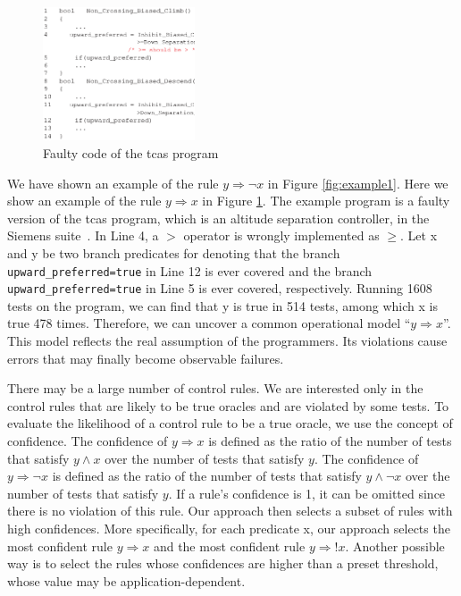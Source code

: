 \documentclass{sig-alternate}
\newcommand{\CodeIn}[1]{{\small\texttt{#1}}}
\begin{document}
\begin{figure}[h]
\begin{center}
  \includegraphics[angle=0,width=0.4\textwidth]{figs/example21.eps}
  \centering
  \caption{Faulty code of the tcas program}
  \label{fig:example2}
\end{center}
\end{figure}


We have shown an example of the rule $y\Rightarrow \neg x$ in Figure
\ref{fig:example1}. Here we show an example of the rule
$y\Rightarrow x$ in Figure \ref{fig:example2}. The example program
is a faulty version of the tcas program, which is an altitude
separation controller, in the Siemens suite~\cite{Hutchins94}. In
Line 4, a $>$ operator is wrongly implemented as $\ge$. Let x and y
be two branch predicates for denoting that the branch
\CodeIn{upward\_preferred=true} in Line 12 is ever covered and the
branch \CodeIn{upward\_preferred=true} in Line 5 is ever covered,
respectively. Running 1608 tests on the program, we can find that y
is true in 514 tests, among which x is true 478 times. Therefore, we
can uncover a common operational model ``$y\Rightarrow x$''. This
model reflects the real assumption of the programmers. Its
violations cause errors that may finally become observable failures.



There may be a large number of control rules. We are interested only
in the control rules that are likely to be true oracles and are
violated by some tests. To evaluate the likelihood of a control rule
to be a true oracle, we use the concept of confidence. The
confidence of $y\Rightarrow x$ is defined as the ratio of the number
of tests that satisfy $y\wedge x$ over the number of tests that
satisfy $y$. The confidence of $y\Rightarrow \neg x$ is defined as
the ratio of the number of tests that satisfy $y\wedge \neg x$ over
the number of tests that satisfy $y$. If a rule's confidence is 1,
it can be omitted since there is no violation of this rule. Our
approach then selects a subset of rules with high confidences. More
specifically, for each predicate x, our approach selects the most
confident rule $y\Rightarrow x$ and the most confident rule
$y\Rightarrow !x$. Another possible way is to select the rules whose
confidences are higher than a preset threshold, whose value may be
application-dependent.
\end{document}
